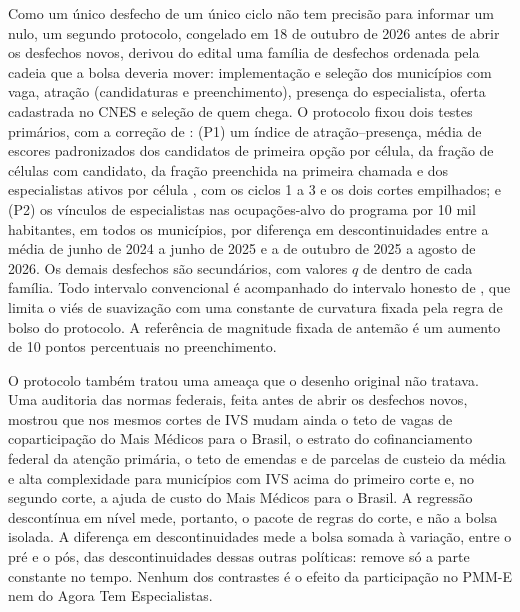 \documentclass[11pt,a4paper]{article}
\begin{document}
Como um único desfecho de um único ciclo não tem precisão para informar um
nulo, um segundo protocolo, congelado em 18 de outubro de 2026 antes de abrir
os desfechos novos, derivou do edital uma família de desfechos ordenada pela
cadeia que a bolsa deveria mover: implementação e seleção dos municípios com
vaga, atração (candidaturas e preenchimento), presença do especialista, oferta
cadastrada no CNES e seleção de quem chega. O protocolo fixou dois testes
primários, com a correção de \citet{holm1979}: (P1) um índice de
atração--presença, média de escores padronizados dos candidatos de primeira
opção por célula, da fração de células com candidato, da fração preenchida na
primeira chamada e dos especialistas ativos por célula \citep{kling2007}, com
os ciclos 1 a 3 e os dois cortes empilhados; e (P2) os vínculos de
especialistas nas ocupações-alvo do programa por 10 mil habitantes, em todos
os municípios, por diferença em descontinuidades \citep{grembi2016} entre a
média de junho de 2024 a junho de 2025 e a de outubro de 2025 a agosto de 2026.
Os demais desfechos são secundários, com valores $q$ de \citet{benjamini2006}
dentro de cada família. Todo intervalo convencional é acompanhado do intervalo
honesto de \citet{armstrong2018,armstrong2020}, que limita o viés de suavização
com uma constante de curvatura fixada pela regra de bolso do protocolo. A
referência de magnitude fixada de antemão é um aumento de 10 pontos
percentuais no preenchimento.

O protocolo também tratou uma ameaça que o desenho original não tratava. Uma
auditoria das normas federais, feita antes de abrir os desfechos novos,
mostrou que nos mesmos cortes de IVS mudam ainda o teto de vagas de
coparticipação do Mais Médicos para o Brasil, o estrato do cofinanciamento
federal da atenção primária, o teto de emendas e de parcelas de custeio da
média e alta complexidade para municípios com IVS acima do primeiro corte e, no
segundo corte, a ajuda de custo do Mais Médicos para o Brasil. A regressão
descontínua em nível mede, portanto, o pacote de regras do corte, e não a bolsa
isolada. A diferença em descontinuidades mede a bolsa somada à variação, entre
o pré e o pós, das descontinuidades dessas outras políticas: remove só a parte
constante no tempo. Nenhum dos contrastes é o efeito da participação no PMM-E
nem do Agora Tem Especialistas.
\end{document}
